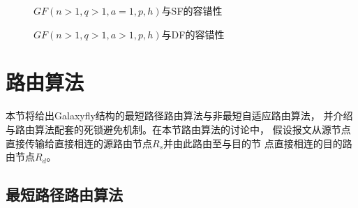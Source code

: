 \begin{figure}
  \centering
  \begin{minipage}[t]{\textwidth}
    \centering
    \caption{$GF(n\!\!>\!\!1,q\!\!>\!\!1,a\!\!=\!\!1,p,h)$与SF的容错性}
  \label{fig:Figure8a}
  \end{minipage}
\end{figure}
\begin{figure}
  \centering
  \begin{minipage}[t]{\textwidth}
    \centering
    \caption{$GF(n\!\!>\!\!1,q\!\!>\!\!1,a\!\!>\!\!1,p,h)$与DF的容错性}
    \label{fig:Figure8b}
  \end{minipage}
\end{figure}


\section{路由算法}

本节将给出Galaxyfly结构的最短路径路由算法与非最短自适应路由算法，
并介绍与路由算法配套的死锁避免机制。在本节路由算法的讨论中，
假设报文从源节点直接传输给直接相连的源路由节点$R_s$并由此路由至与目的节
点直接相连的目的路由节点$R_d$。

\subsection{最短路径路由算法}



